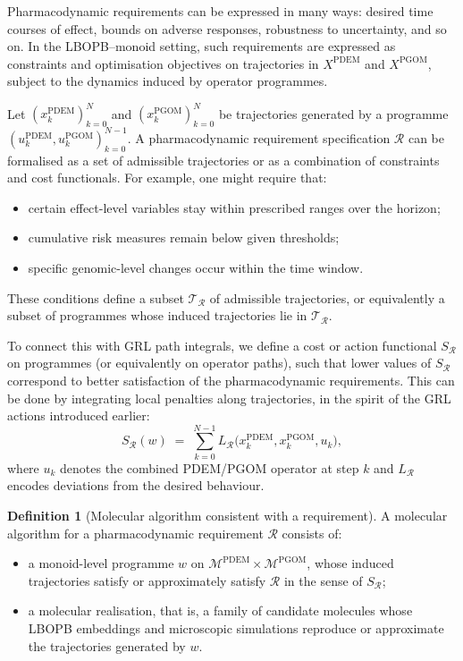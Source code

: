 \documentclass[11pt]{book}
\theoremstyle{plain}
\theoremstyle{definition}
\newtheorem{definition}[theorem]{Definition}
\theoremstyle{remark}
\begin{document}
Pharmacodynamic requirements can be expressed in many ways: desired
time courses of effect, bounds on adverse responses, robustness to
uncertainty, and so on. In the LBOPB–monoid setting, such requirements
are expressed as constraints and optimisation objectives on trajectories
in $X^{\mathrm{PDEM}}$ and $X^{\mathrm{PGOM}}$, subject to the dynamics
induced by operator programmes.

Let $(x^{\mathrm{PDEM}}_{k})_{k=0}^{N}$ and
$(x^{\mathrm{PGOM}}_{k})_{k=0}^{N}$ be trajectories generated by a
programme \\$(u^{\mathrm{PDEM}}_{k}, u^{\mathrm{PGOM}}_{k})_{k=0}^{N-1}$.
A pharmacodynamic requirement specification $\mathcal{R}$ can be
formalised as a set of admissible trajectories or as a combination of
constraints and cost functionals. For example, one might require that:
\begin{itemize}
  \item certain effect-level variables stay within prescribed ranges
        over the horizon;
  \item cumulative risk measures remain below given thresholds;
  \item specific genomic-level changes occur within the time window.
\end{itemize}
These conditions define a subset
$\mathcal{T}_{\mathcal{R}}$ of admissible trajectories, or equivalently
a subset of programmes whose induced trajectories lie in
$\mathcal{T}_{\mathcal{R}}$.

To connect this with GRL path integrals, we define a cost or action
functional $S_{\mathcal{R}}$ on programmes (or equivalently on operator
paths), such that lower values of $S_{\mathcal{R}}$ correspond to
better satisfaction of the pharmacodynamic requirements. This can be
done by integrating local penalties along trajectories, in the spirit
of the GRL actions introduced earlier:
\[
  S_{\mathcal{R}}(w)
  \;=\;
  \sum_{k=0}^{N-1} L_{\mathcal{R}}
  \bigl(x^{\mathrm{PDEM}}_{k}, x^{\mathrm{PGOM}}_{k}, u_{k}\bigr),
\]
where $u_{k}$ denotes the combined PDEM/PGOM operator at step $k$ and
$L_{\mathcal{R}}$ encodes deviations from the desired behaviour.

\begin{definition}[Molecular algorithm consistent with a requirement]
A molecular algorithm for a pharmacodynamic requirement $\mathcal{R}$
consists of:
\begin{itemize}
  \item a monoid-level programme $w$ on
        $\mathcal{M}^{\mathrm{PDEM}} \times \mathcal{M}^{\mathrm{PGOM}}$,
        whose induced trajectories satisfy or approximately satisfy
        $\mathcal{R}$ in the sense of $S_{\mathcal{R}}$;
  \item a molecular realisation, that is, a family of candidate
        molecules whose LBOPB embeddings and microscopic simulations
        reproduce or approximate the trajectories generated by $w$.
\end{itemize}
\end{definition}
\end{document}
